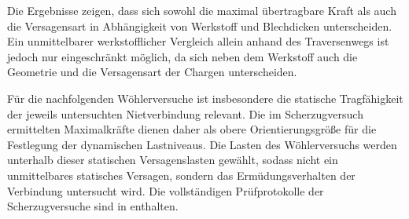  Die Ergebnisse zeigen, dass sich sowohl die maximal übertragbare Kraft als auch die
Versagensart in Abhängigkeit von Werkstoff und Blechdicken unterscheiden. Ein
unmittelbarer werkstofflicher Vergleich allein anhand des Traversenwegs ist jedoch nur
eingeschränkt möglich, da sich neben dem Werkstoff auch die Geometrie und die
Versagensart der Chargen unterscheiden.

Für die nachfolgenden Wöhlerversuche ist insbesondere die statische Tragfähigkeit der
jeweils untersuchten Nietverbindung relevant. Die im Scherzugversuch ermittelten
Maximalkräfte dienen daher als obere Orientierungsgröße für die Festlegung der
dynamischen Lastniveaus. Die Lasten des Wöhlerversuchs werden unterhalb dieser
statischen Versagenslasten gewählt, sodass nicht ein unmittelbares statisches Versagen,
sondern das Ermüdungsverhalten der Verbindung untersucht wird. Die vollständigen
Prüfprotokolle der Scherzugversuche sind in  enthalten.
